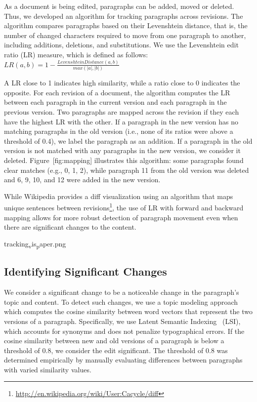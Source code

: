 As a document is being edited, paragraphs can be added, moved or
deleted. Thus, we developed an algorithm for tracking paragraphs across
revisions. The algorithm compares paragraphs based on their Levenshtein
distance, that is, the number of changed characters required to move
from one paragraph to another, including additions, deletions, and
substitutions. We use the Levenshtein edit ratio (LR) measure, which is
defined as follows:
\(LR(a,b) = 1-\frac{Levenshtein Distance(a,b)}{max(|a|,|b|)} \)

A LR close to 1 indicates high similarity, while a ratio close to 0
indicates the opposite. For each revision of a document, the algorithm
computes the LR between each paragraph in the current version and each
paragraph in the previous version. Two paragraphs are mapped across the
revision if they each have the highest LR with the other. If a paragraph
in the new version has no matching paragraphs in the old version (i.e.,
none of its ratios were above a threshold of 0.4), we label the
paragraph as an addition. If a paragraph in the old version is not
matched with any paragraphs in the new version, we consider it deleted.
Figure~{[}fig:mapping{]} illustrates this algorithm: some paragraphs
found clear matches (e.g., 0, 1, 2), while paragraph 11 from the old
version was deleted and 6, 9, 10, and 12 were added in the new version.

While Wikipedia provides a diff visualization using an algorithm that
maps unique sentences between revisions\footnote{\url{http://en.wikipedia.org/wiki/User:Cacycle/diff}},
the use of LR with forward and backward mapping allows for more robust
detection of paragraph movement even when there are significant changes
to the content.

tracking\textsubscript{v}is\textsubscript{p}aper.png

\subsection{Identifying Significant
Changes}\label{identifying-significant-changes}

We consider a significant change to be a noticeable change in the
paragraph's topic and content. To detect such changes, we use a topic
modeling approach which computes the cosine similarity between word
vectors that represent the two versions of a paragraph. Specifically, we
use Latent Semantic Indexing~\cite{deerwester1990indexing} (LSI), which
accounts for synonyms and does not penalize typographical errors. If the
cosine similarity between new and old versions of a paragraph is below a
threshold of 0.8, we consider the edit significant. The threshold of 0.8
was determined empirically by manually evaluating differences between
paragraphs with varied similarity values.

